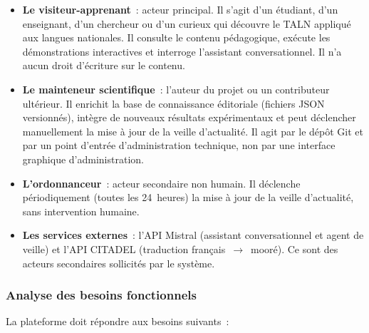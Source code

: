 \begin{itemize}
	\item \textbf{Le visiteur-apprenant}~: acteur principal. Il s'agit d'un étudiant,
	d'un enseignant, d'un chercheur ou d'un curieux qui découvre le TALN appliqué aux
	langues nationales. Il consulte le contenu pédagogique, exécute les démonstrations
	interactives et interroge l'assistant conversationnel. Il n'a aucun droit
	d'écriture sur le contenu.

	\item \textbf{Le mainteneur scientifique}~: l'auteur du projet ou un contributeur
	ultérieur. Il enrichit la base de connaissance éditoriale (fichiers JSON
	versionnés), intègre de nouveaux résultats expérimentaux et peut déclencher
	manuellement la mise à jour de la veille d'actualité. Il agit par le dépôt Git et
	par un point d'entrée d'administration technique, non par une interface graphique
	d'administration.

	\item \textbf{L'ordonnanceur}~: acteur secondaire non humain. Il déclenche
	périodiquement (toutes les 24~heures) la mise à jour de la veille d'actualité,
	sans intervention humaine.

	\item \textbf{Les services externes}~: l'API Mistral (assistant conversationnel et
	agent de veille) et l'API CITADEL (traduction français~$\rightarrow$~mooré). Ce
	sont des acteurs secondaires sollicités par le système.
\end{itemize}

\subsubsection{Analyse des besoins fonctionnels}

La plateforme doit répondre aux besoins suivants~:

